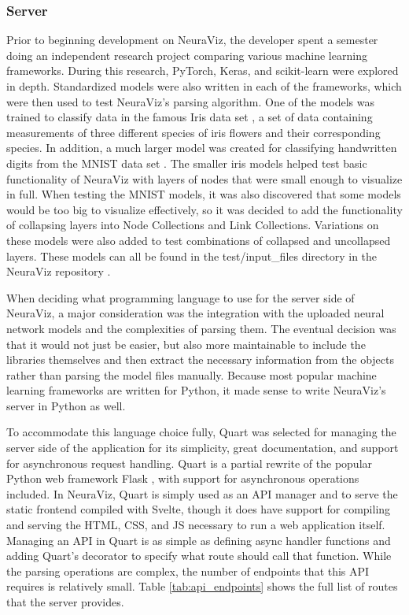 \subsubsection{Server}
Prior to beginning development on NeuraViz, the developer spent a semester doing an independent research project comparing various machine learning frameworks. During this research, PyTorch, Keras, and scikit-learn \cite{scikit} were explored in depth. Standardized models were also written in each of the frameworks, which were then used to test NeuraViz's parsing algorithm. One of the models was trained to classify data in the famous Iris data set \cite{iris}, a set of data containing measurements of three different species of iris flowers and their corresponding species. In addition, a much larger model was created for classifying handwritten digits from the MNIST data set \cite{mnist}. The smaller iris models helped test basic functionality of NeuraViz with layers of nodes that were small enough to visualize in full. When testing the MNIST models, it was also discovered that some models would be too big to visualize effectively, so it was decided to add the functionality of collapsing layers into Node Collections and Link Collections. Variations on these models were also added to test combinations of collapsed and uncollapsed layers. These models can all be found in the test/input\_files directory in the NeuraViz repository \cite{neuraviz_repo}.

When deciding what programming language to use for the server side of NeuraViz, a major consideration was the integration with the uploaded neural network models and the complexities of parsing them. The eventual decision was that it would not just be easier, but also more maintainable to include the libraries themselves and then extract the necessary information from the objects rather than parsing the model files manually. Because most popular machine learning frameworks are written for Python, it made sense to write NeuraViz's server in Python as well. 

To accommodate this language choice fully, Quart \cite{quart} was selected for managing the server side of the application for its simplicity, great documentation, and support for asynchronous request handling. Quart is a partial rewrite of the popular Python web framework Flask \cite{flask}, with support for asynchronous operations included. In NeuraViz, Quart is simply used as an API manager and to serve the static frontend compiled with Svelte, though it does have support for compiling and serving the HTML, CSS, and JS necessary to run a web application itself. Managing an API in Quart is as simple as defining async handler functions and adding Quart's decorator to specify what route should call that function. While the parsing operations are complex, the number of endpoints that this API requires is relatively small. Table \ref{tab:api_endpoints} shows the full list of routes that the server provides.

